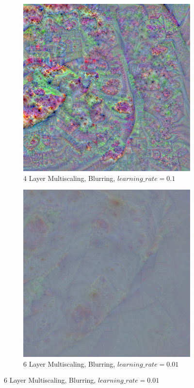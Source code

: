 \begin{figure}
    \captionsetup{justification=centering}

    \begin{subfigure}[t]{0.46\textwidth}
        \captionsetup{justification=centering}
        \centering
        \includegraphics[width=.7\linewidth]{figuras/feat_vis/experiments/classes/cl963/random_image_ci963_lr1e-1_pl4.png}
        \caption{4 Layer Multiscaling, Blurring, \(learning\_rate = 0.1\)}
    \end{subfigure}
    \hfill
    \begin{subfigure}[t]{0.46\textwidth}
        \captionsetup{justification=centering}
        \centering
        \includegraphics[width=.7\linewidth]{figuras/feat_vis/experiments/classes/cl963/random_image_ci963_lr1e-2_pl6.png}
        \caption{6 Layer Multiscaling, Blurring, \(learning\_rate = 0.01\)}

\end{subfigure}
\end{figure}

